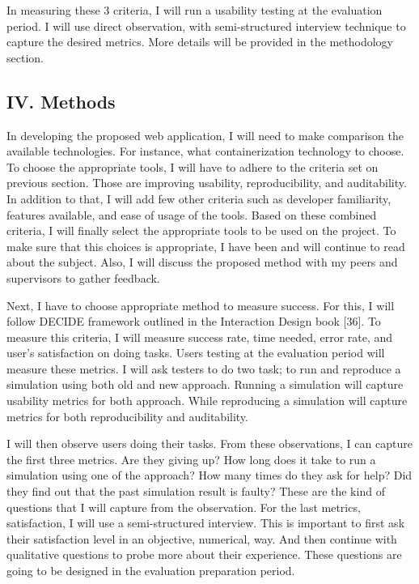 \documentclass[]{article}
\begin{document}
In measuring these 3 criteria, I will run a usability testing at the
evaluation period. I will use direct observation, with semi-structured
interview technique to capture the desired metrics. More details will be
provided in the methodology section.

\subsection{IV. Methods}\label{iv.-methods}

In developing the proposed web application, I will need to make
comparison the available technologies. For instance, what
containerization technology to choose. To choose the appropriate tools,
I will have to adhere to the criteria set on previous section. Those are
improving usability, reproducibility, and auditability. In addition to
that, I will add few other criteria such as developer familiarity,
features available, and ease of usage of the tools. Based on these
combined criteria, I will finally select the appropriate tools to be
used on the project. To make sure that this choices is appropriate, I
have been and will continue to read about the subject. Also, I will
discuss the proposed method with my peers and supervisors to gather
feedback.

Next, I have to choose appropriate method to measure success. For this,
I will follow DECIDE framework outlined in the Interaction Design book
{[}36{]}. To measure this criteria, I will measure success rate, time
needed, error rate, and user's satisfaction on doing tasks. Users
testing at the evaluation period will measure these metrics. I will ask
testers to do two task; to run and reproduce a simulation using both old
and new approach. Running a simulation will capture usability metrics
for both approach. While reproducing a simulation will capture metrics
for both reproducibility and auditability.

I will then observe users doing their tasks. From these observations, I
can capture the first three metrics. Are they giving up? How long does
it take to run a simulation using one of the approach? How many times do
they ask for help? Did they find out that the past simulation result is
faulty? These are the kind of questions that I will capture from the
observation. For the last metrics, satisfaction, I will use a
semi-structured interview. This is important to first ask their
satisfaction level in an objective, numerical, way. And then continue
with qualitative questions to probe more about their experience. These
questions are going to be designed in the evaluation preparation period.
\end{document}
